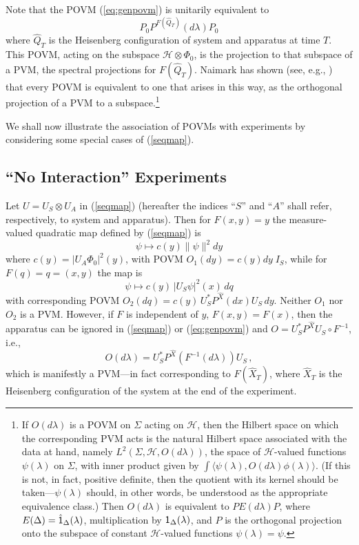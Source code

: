 \documentclass[12pt]{article}
\newcommand{\eq}[1]{(\ref{#1})}
\renewcommand{\dagger}{\ast}
\newcommand{\lam}{\lambda}
\newcommand{\ot}{\otimes}
\renewcommand{\H}{\mbox{$\mathcal{H}$}}
\newcommand{\norm}{\|}
\begin{document}
Note that the POVM \eq{eq:genpovm} is unitarily equivalent to
\begin{equation}
P_0 P^{F(\hat{Q}_T)}(d\lam) P_0
\label{eq:genpovmue}
\end{equation}
where $\hat{Q}_T$ is the Heisenberg configuration of system and
apparatus at time $T$. This POVM, acting on the subspace
$\H\ot\Phi_{0}$, is the projection to that subspace of a PVM, the
spectral projections for $F(\hat{Q}_T)$. Naimark has shown (see, e.g.,
\cite{Dav76}) that every POVM is equivalent to one that arises in this
way, as the orthogonal projection of a PVM to a subspace.\footnote{If
   $O(d\lam)$ is a POVM on $\Sigma$ acting on \H{}, then the Hilbert
   space on which the corresponding PVM acts is the natural Hilbert
   space associated with the data at hand, namely $L^2(\Sigma, \H,
   O(d\lam))$, the space of \H-valued functions $\psi(\lam)$ on
   $\Sigma$, with inner product given by $\int \langle\psi(\lam),
   O(d\lam)\phi(\lam)\rangle$. (If this is not, in fact, positive
   definite, then the quotient with its kernel should be
   taken---$\psi(\lam)$ should, in other words, be understood as the
   appropriate equivalence class.) Then $ O(d\lam)$ is equivalent to
   $PE(d\lam)P$, where $E(\Delta) =\hat{{\sf 1}}_{\Delta}(\lam)$,
   multiplication by ${\sf 1}_{\Delta}(\lam)$, and $P$ is the
   orthogonal projection onto the subspace of constant \H-valued
   functions $\psi(\lam)=\psi$.}

We shall now illustrate the association of POVMs with experiments by
considering some special cases of (\ref{seqmap}).

\subsection{``No Interaction'' Experiments }
\label{sec:nie}
Let $U=U_{S} \ot U_{A}$ in (\ref{seqmap}) (hereafter the indices
``$S$'' and ``$A$'' shall refer, respectively, to system and
apparatus).  Then for $F(x,y)=y$ the measure-valued quadratic map
defined by (\ref{seqmap}) is
$$
\psi\mapsto c(y) \norm\psi\norm^2 dy
$$
where $c(y) = |U_{A}\Phi_{0}|^{2}(y)$, with POVM $O_1(dy)= c(y) dy
\;I_S$, while for $F(q)=q=(x,y)$ the map is
$$
\psi \mapsto c(y)\, |U_{S}\psi|^{2}(x)\, dq$$
with corresponding
POVM $O_2(dq) = c(y)\, U_{S}^\dagger P^{\hat X}(dx)U_{S}\, dy$.
Neither $O_1$ nor $O_2$ is a PVM. However, if $F$ is independent of
$y$, $F(x,y) =F(x)$, then the apparatus can be ignored in
(\ref{seqmap}) or (\ref{eq:genpovm}) and $O= U_{S}^{*}
P^{\hat{X}}U_{S}\circ F^{-1}$, i.e.,
$$
O(d\lam) = U_{S}^{*} P^{\hat{X}} (F^{-1}(d\lam))U_{S} \, ,
$$
which is manifestly a PVM---in fact corresponding to $
F(\hat{X}_T)$, where $\hat{X}_T$ is the Heisenberg configuration of
the system at the end of the experiment.
\end{document}
